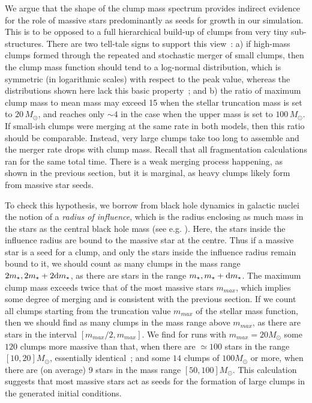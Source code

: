 We argue that the shape of the clump mass spectrum provides indirect evidence for the role of massive stars predominantly as seeds for growth in our simulation. This is to be opposed to a full hierarchical build-up of clumps from very tiny sub-structures. There are two tell-tale signs to support this view~: a) if high-mass clumps formed through the repeated and stochastic merger of small clumps, then the clump mass function should tend to a log-normal distribution, which is  symmetric (in logarithmic scales) with respect to the peak value, whereas the distributions shown here lack this basic property~; and b) the ratio of maximum clump mass to mean mass may exceed 15 when the  stellar truncation mass is set to $20\, M_\odot$, and reaches only $\sim 4$ in the case when the upper mass is set to $100\, M_\odot$. If small-ish clumps were merging at the same rate in both models, then this ratio should be comparable. Instead, very large clumps take too long to assemble and the merger rate drops with clump mass. Recall that all fragmentation calculations ran for the same total time. There is a weak merging process happening, as shown in the previous section, but it is marginal, as heavy clumps likely form from massive star seeds.

To check this hypothesis, we borrow from black hole dynamics in galactic nuclei the notion of a {\it radius of influence}, which is the radius  enclosing as much mass in the stars as the central black hole mass (see e.g. \citealt{Merritt2013}).  Here, the stars inside the influence radius are bound to the massive star at the centre. Thus if a massive star is a seed for a clump, and only the stars inside the influence radius remain bound to it, we should count as many clumps in the mass range $2m_\star, 2 m_\star + 2{\rm d}m_\star$, as there are stars in the range $m_\star, m_\star + {\rm d}m_\star$.  The maximum clump mass exceeds twice that of the most massive stars $m_{max}$, which implies some degree of merging and is consistent with the previous section. If we count all clumps starting from the truncation value $m_{max}$ of the stellar mass function,  
then we should find as many clumps in the mass range above $m_{max}$, as there are stars in the interval $[m_{max}/2, m_{max}]$.  We find for runs with $m_{max} = 20 M_\odot$ some $120$ clumps more massive than that, when there are $\simeq 100$ stars in the range $[10, 20] M_\odot$, essentially identical~; and some $14$ clumps of $100 M_\odot$ or more, when there are (on average) 9 stars in the mass range $[50, 100] M_\odot$. This calculation suggests that  most massive stars act as seeds for the formation of large clumps in the generated initial conditions.













